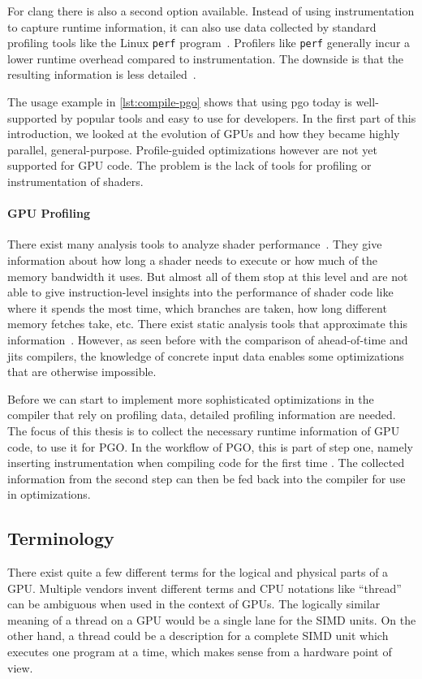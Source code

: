 For clang there is also a second option available. Instead of using instrumentation to capture runtime information, it can also use data collected by standard profiling tools like the Linux \texttt{perf} program~\cite{LinuxPerf}. Profilers like \texttt{perf} generally incur a lower runtime overhead compared to instrumentation. The downside is that the resulting information is less detailed~\cite{ClangManual}.

The usage example in \cref{lst:compile-pgo} shows that using \gls{pgo} today is well-supported by popular tools and easy to use for developers.
In the first part of this introduction, we looked at the evolution of GPUs and how they became highly parallel, general-purpose. Profile-guided optimizations however are not yet supported for GPU code. The problem is the lack of tools for profiling or instrumentation of shaders.

\paragraph{GPU Profiling} There exist many analysis tools to analyze shader performance~\cite{RenderDoc, NvidiaShaderPerf}. They give information about how long a shader needs to execute or how much of the memory bandwidth it uses. But almost all of them stop at this level and are not able to give instruction-level insights into the performance of shader code like where it spends the most time, which branches are taken, how long different memory fetches take, etc.
There exist static analysis tools that approximate this information~\cite{AMDShaderAnalyzer}. However, as seen before with the comparison of ahead-of-time and \glspl{jit} compilers, the knowledge of concrete input data enables some optimizations that are otherwise impossible.

Before we can start to implement more sophisticated optimizations in the compiler that rely on profiling data, detailed profiling information are needed.
The focus of this thesis is to collect the necessary runtime information of GPU code, to use it for PGO. In the workflow of PGO, this is part of step one, namely inserting instrumentation when compiling code for the first time%
. The collected information from the second step can then be fed back into the compiler for use in optimizations.

\subsection{Terminology}
\label{sub:terminology}
There exist quite a few different terms for the logical and physical parts of a GPU. Multiple vendors invent different terms and CPU notations like \enquote{thread} can be ambiguous when used in the context of GPUs. The logically similar meaning of a thread on a GPU would be a single lane for the SIMD units. On the other hand, a thread could be a description for a complete SIMD unit which executes one program at a time, which makes sense from a hardware point of view.

